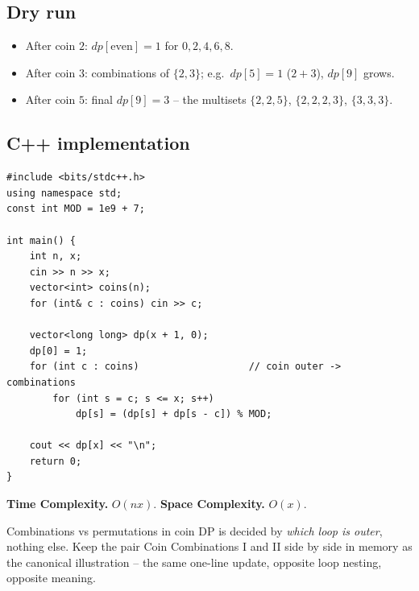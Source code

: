 \subsection*{Dry run}


\begin{itemize}
  \item After coin $2$: $\textit{dp}[\text{even}]=1$ for $0,2,4,6,8$.
  \item After coin $3$: combinations of $\{2,3\}$; e.g.\
        $\textit{dp}[5]=1$ ($2{+}3$), $\textit{dp}[9]$ grows.
  \item After coin $5$: final $\textit{dp}[9]=3$ -- the multisets
        $\{2,2,5\}$, $\{2,2,2,3\}$, $\{3,3,3\}$.
\end{itemize}

\subsection*{C++ implementation}

\begin{lstlisting}
#include <bits/stdc++.h>
using namespace std;
const int MOD = 1e9 + 7;

int main() {
    int n, x;
    cin >> n >> x;
    vector<int> coins(n);
    for (int& c : coins) cin >> c;

    vector<long long> dp(x + 1, 0);
    dp[0] = 1;
    for (int c : coins)                   // coin outer -> combinations
        for (int s = c; s <= x; s++)
            dp[s] = (dp[s] + dp[s - c]) % MOD;

    cout << dp[x] << "\n";
    return 0;
}
\end{lstlisting}

\begin{complexitybox}
\textbf{Time Complexity.} $O(nx)$. \textbf{Space Complexity.} $O(x)$.
\end{complexitybox}

\begin{takeawaybox}
Combinations vs permutations in coin DP is decided by \emph{which loop is
outer}, nothing else. Keep the pair Coin Combinations I and II side by
side in memory as the canonical illustration -- the same one-line update,
opposite loop nesting, opposite meaning.
\end{takeawaybox}
